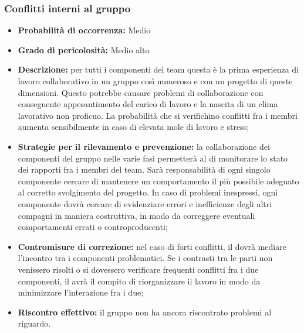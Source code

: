 \subsubsection{Conflitti interni al gruppo}
\hypertarget{subsubsect:conflitti}{}
\begin{itemize}
\item \textbf{Probabilità di occorrenza:} Medio
\item \textbf{Grado di pericolosità:} Medio alto

\item \textbf{Descrizione:} per tutti i componenti del team questa è la prima esperienza di lavoro collaborativo in un gruppo così numeroso e con un progetto di queste dimensioni. Questo potrebbe causare problemi di collaborazione con conseguente appesantimento del carico di lavoro e la nascita di un clima lavorativo non proficuo. La probabilità che si verifichino conflitti fra i membri aumenta sensibilmente in caso di elevata mole di lavoro e stress;

\item \textbf{Strategie per il rilevamento e prevenzione:} la collaborazione dei componenti del gruppo nelle varie fasi permetterà al \ruoloResponsabile{} di monitorare lo stato dei rapporti fra i membri del team. Sarà responsabilità di ogni singolo componente cercare di mantenere un comportamento il più possibile adeguato al corretto svolgimento del progetto. In caso di problemi inespressi, ogni componente dovrà cercare di evidenziare errori e inefficienze degli altri compagni in maniera costruttiva, in modo da correggere eventuali comportamenti errati o controproducenti;

\item \textbf{Contromisure di correzione:} nel caso di forti conflitti, il \ruoloResponsabile{} dovrà mediare l'incontro tra i componenti problematici. Se i contrasti tra le parti non venissero risolti o si dovessero verificare frequenti conflitti fra i due componenti, il \ruoloResponsabile{} avrà il compito di riorganizzare il lavoro in modo da minimizzare l'interazione fra i due;

\item \textbf{Riscontro effettivo:} il gruppo non ha ancora riscontrato problemi al riguardo.
\end{itemize}

